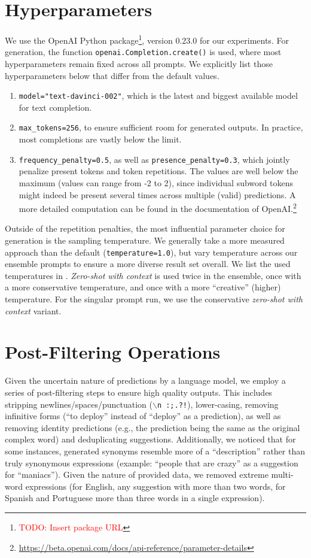 \documentclass[11pt]{article}
\newcommand{\todo}[1]{\textcolor{red}{TODO: #1}}
\begin{document}
\section{Hyperparameters}
We use the OpenAI Python package\footnote{\todo{Insert package URL}}, version 0.23.0 for our experiments. For generation, the function \texttt{openai.Completion.create()} is used, where most hyperparameters remain fixed across all prompts. We explicitly list those hyperparameters below that differ from the default values.
\begin{enumerate}
	\item \texttt{model="text-davinci-002"}, which is the latest and biggest available model for text completion.
	\item \texttt{max\_tokens=256}, to ensure sufficient room for generated outputs. In practice, most completions are vastly below the limit.
	\item \texttt{frequency\_penalty=0.5}, as well as \texttt{presence\_penalty=0.3}, which jointly penalize present tokens and token repetitions. The values are well below the maximum (values can range from -2 to 2), since individual subword tokens might indeed be present several times across multiple (valid) predictions. A more detailed computation can be found in the documentation of OpenAI.\footnote{\url{https://beta.openai.com/docs/api-reference/parameter-details}}
\end{enumerate}

\noindent Outside of the repetition penalties, the most influential parameter choice for generation is the sampling temperature. We generally take a more measured approach than the default (\texttt{temperature=1.0}), but vary temperature across our ensemble prompts to ensure a more diverse result set overall. We list the used temperatures in . \emph{Zero-shot with context} is used twice in the ensemble, once with a more conservative temperature, and once with a more ``creative'' (higher) temperature. For the singular prompt run, we use the conservative \emph{zero-shot with context} variant.

\section{Post-Filtering Operations}
\label{sec:filters}
Given the uncertain nature of predictions by a language model, we employ a series of post-filtering steps to ensure high quality outputs. This includes stripping newlines/spaces/punctuation (\texttt{$\backslash$n :;.?!}), lower-casing, removing infinitive forms (``to deploy'' instead of ``deploy'' as a prediction), as well as removing identity predictions (e.g., the prediction being the same as the original complex word) and deduplicating suggestions. Additionally, we noticed that for some instances, generated synonyms resemble more of a ``description'' rather than truly synonymous expressions (example: ``people that are crazy'' as a suggestion for ``maniacs''). Given the nature of provided data, we removed extreme multi-word expressions (for English, any suggestion with more than two words, for Spanish and Portuguese more than three words in a single expression).
\end{document}
